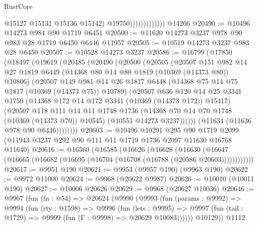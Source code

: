 \begin{lexlean}{RustCore}
\begin{coremodule}
                                @15127
                                @15131
                                @15136
                                @15142)
                              @19750)))))))))))))
    @14266
@20490 := @10496 @14273 @984 @90 @1719 @6451
@20500 := @11620 @14273 @3237 @978 @90 @983 @28 @1719 @6450 @6446 @11957
@20505 := @10519 @14273 @3237 @983 @28 @6450
@20507 := @10528 @14273 @3237
@20586 := @16799
    (@17850
      (@18497
        (@19619
          (@20485
            (@20490
              (@20500
                (@20505
                  (@20507
                    @151
                    @982
                    @14
                    @27
                    @1819
                    @6449
                    (@14368 @80 @14 @80 @1819 (@10369 (@14373 @80)) @10806)
                    (@20507
                      @149
                      @981
                      @14
                      @26
                      @1817
                      @6448
                      (@14368 @75 @14 @75 @1817 (@10369 (@14373 @75)) @10789)
                      (@20507
                        @636
                        @120
                        @14
                        @25
                        @3341
                        @1750
                        (@14368 @172 @14 @172 @3341 (@10369 (@14373 @172)) @15417)
                        (@20507
                          @118
                          @111
                          @14
                          @11
                          @1748
                          @1736
                          (@14368 @70 @14 @70 @1748 (@10369 (@14373 @70)) @10545)
                          (@10551 @14273 @3237))))))
                (@11634 (@11636 @978 @90 @6446))))))))
@20603 := @10496
    @10291
    @295
    @90
    @1719
    @2099
    (@11943 @3237 @292 @90 @111 @11 @1719 @1736 @2097 @11630 @16768 @11640)
@20616 := @16560
    (@16585
      (@16626
        (@16628
          (@16630 (@16647 (@16665 (@16682 (@16695 (@16704 (@16708 (@16788 (@20586 @20603))))))))))))
@20617 := @9951 @190
@20621 := @9953 (@9957 @190) (@9963 @190)
@20622 := @9972 @11000
@20624 := @9968 (@20622 @9987)
@20626 := @10010 (@10011 @190)
@20627 := @10006 @20626
@20629 := @9968 (@20627 @10036)
@20646 := @9967
    (fun (fn : @54) =>
    @20624
      (@9990
        (@9993
          (fun (params : @9992) =>
          @9994
            (fun (rty : @1598) =>
            @9996
              (fun (lets : @9995) =>
              @9997 (fun (tail : @1729) => @9999 (fun (Γ : @9998) => @20629 @10083))))))
        @10129))
    @1112

\end{coremodule}
\end{lexlean}
